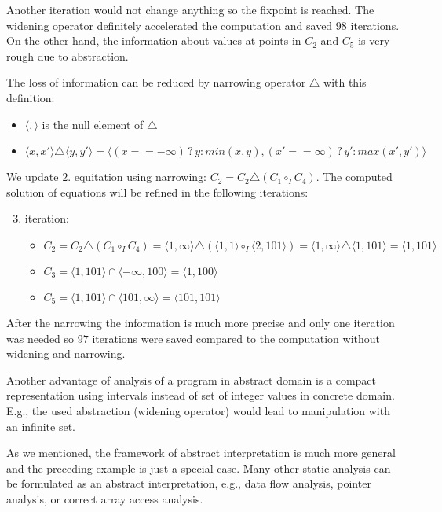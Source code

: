 \documentclass[a4paper, 12pt]{article}
\newcommand{\interval}[2]{\langle #1,#2 \rangle}
\newcommand{\ajoin}[0]{\circ}
\newcommand{\nar}[0]{\triangle}
\newcommand{\iintg}[0]{I}
\newcommand{\ijoin}[0]{\ajoin_\iintg}
\begin{document}
Another iteration would not change anything so the fixpoint is reached.
The widening operator definitely accelerated the computation and
saved $98$ iterations.
On the other hand, the information about values at points in $C_2$ and $C_5$
is very rough due to abstraction.

The loss of information can be reduced by narrowing operator $\nar$ with
this definition:
\begin{itemize}
	\item $\interval{}{}$ is the null element of $\nar$
	\item $\interval{x}{x'} \nar \interval{y}{y'} =
		\interval{(x == -\infty)\,?\,y : min(x,y)}{(x' == \infty)\,?\,y' : max(x',y')}$
\end{itemize}

We update $2.$ equitation using narrowing:
$C_2 = C_2 \nar (C_1 \ijoin C_4)$.
The computed solution of equations will be refined in the following iterations:
\begin{enumerate}
	\setcounter{enumi}{2}
	\item \hspace{-0.5em} iteration:
		\begin{itemize}
			\item $C_2 = C_2 \nar (C_1 \ijoin C_4) = \interval{1}{\infty} \nar
				(\interval{1}{1} \ijoin \interval{2}{101}) = \interval{1}{\infty} \nar \interval{1}{101} = 
				\interval{1}{101}$
			\item $C_3 = \interval{1}{101} \cap \interval{-\infty}{100} = \interval{1}{100}$
			\item $C_5 = \interval{1}{101} \cap \interval{101}{\infty} = \interval{101}{101}$
		\end{itemize}
\end{enumerate}

After the narrowing the information is much more precise and only one iteration
was needed so $97$ iterations were saved compared to the computation without
widening and narrowing.

Another advantage of analysis of a program in abstract domain is a compact
representation using intervals instead of set of integer values in concrete domain.
E.g., the used abstraction (widening operator) would lead to manipulation
with an infinite set.
\vspace{-0.5cm}
\eexmp
\vspace{0.5cm}


As we mentioned, the framework of abstract interpretation
is much more general and the preceding example is just
a special case.
Many other static analysis can be formulated as
an abstract interpretation, e.g., data flow analysis,
pointer analysis, or correct array access analysis.
\end{document}
